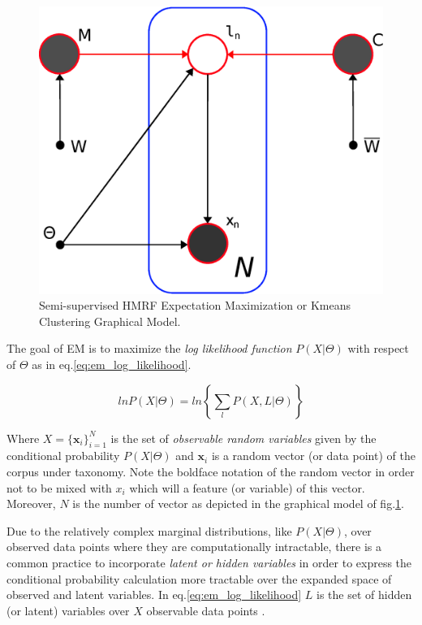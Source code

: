 \documentclass[dvips,dvipdfm,pdftex]{llncs}
\begin{document}
\begin{figure}[h]
	\begin{center}
		\includegraphics[scale=0.40]{figures/SemiSupervised_HMRF_EM_Graphical_Model.eps}
		\caption{Semi-supervised HMRF Expectation Maximization or Kmeans Clustering Graphical Model.}
		\label{fig:hmrf_em}
	\end{center}
\end{figure}

The goal of EM is to maximize the \emph{log likelihood function} $P(X|\Theta)$ with respect of $\Theta$ as in eq.\ref{eq:em_log_likelihood}.

\begin{equation}
lnP(X|\Theta)=ln\left\{ \sum_{l}P(X,L|\Theta)\right\}
\label{eq:em_log_likelihood}
\end{equation}

Where $X=\{\mathbf{x}_{i}\}_{i=1}^{N}$ is the set of \emph{observable random variables} given by the conditional probability $P(X|\Theta)$ and $\mathbf{x}_{i}$ is a random vector (or data point) of the corpus under taxonomy. Note the boldface notation of the random vector in order not to be mixed with $x_{i}$ which will a feature (or variable) of this vector. Moreover, $N$ is the number of vector as depicted in the graphical model of fig.\ref{fig:hmrf_em}.

Due to the relatively complex marginal distributions, like $P(X|\Theta)$, over observed data points where they are computationally intractable, there is a common practice to incorporate \emph{latent or hidden variables} in order to express the conditional probability calculation more tractable over the expanded space of observed and latent variables. In eq.\ref{eq:em_log_likelihood} $L$ is the set of hidden (or latent) variables over $X$ observable data points \cite{bishop2006_EM_general_view}.
\end{document}
